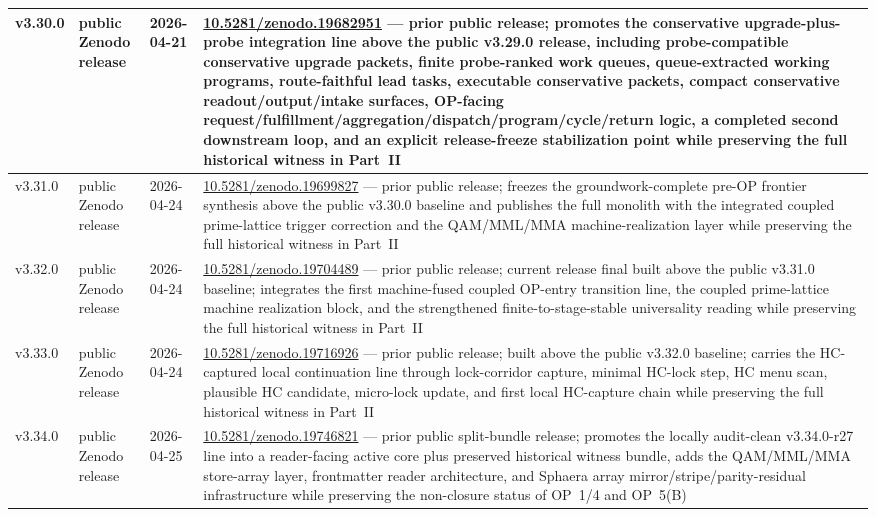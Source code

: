 {\begin{longtable}{|p{}|p{}|p{}|p{}|}
\hline
v3.30.0 & public Zenodo release & 2026-04-21 & \href{https://doi.org/10.5281/zenodo.19682951}{10.5281/zenodo.19682951} --- prior public release; promotes the conservative upgrade-plus-probe integration line above the public v3.29.0 release, including probe-compatible conservative upgrade packets, finite probe-ranked work queues, queue-extracted working programs, route-faithful lead tasks, executable conservative packets, compact conservative readout/output/intake surfaces, OP-facing request/fulfillment/aggregation/dispatch/program/cycle/return logic, a completed second downstream loop, and an explicit release-freeze stabilization point while preserving the full historical witness in Part~II \\
\hline
v3.31.0 & public Zenodo release & 2026-04-24 & \href{https://doi.org/10.5281/zenodo.19699827}{10.5281/zenodo.19699827} --- prior public release; freezes the groundwork-complete pre-OP frontier synthesis above the public v3.30.0 baseline and publishes the full monolith with the integrated coupled prime-lattice trigger correction and the QAM/MML/MMA machine-realization layer while preserving the full historical witness in Part~II \\
\hline
v3.32.0 & public Zenodo release & 2026-04-24 & \href{https://doi.org/10.5281/zenodo.19704489}{10.5281/zenodo.19704489} --- prior public release; current release final built above the public v3.31.0 baseline; integrates the first machine-fused coupled OP-entry transition line, the coupled prime-lattice machine realization block, and the strengthened finite-to-stage-stable universality reading while preserving the full historical witness in Part~II \\
v3.33.0 & public Zenodo release & 2026-04-24 & \href{https://doi.org/10.5281/zenodo.19716926}{10.5281/zenodo.19716926} --- prior public release; built above the public v3.32.0 baseline; carries the HC-captured local continuation line through lock-corridor capture, minimal HC-lock step, HC menu scan, plausible HC candidate, micro-lock update, and first local HC-capture chain while preserving the full historical witness in Part~II \\
\hline
v3.34.0 & public Zenodo release & 2026-04-25 & \href{https://doi.org/10.5281/zenodo.19746821}{10.5281/zenodo.19746821} --- prior public split-bundle release; promotes the locally audit-clean v3.34.0-r27 line into a reader-facing active core plus preserved historical witness bundle, adds the QAM/MML/MMA store-array layer, frontmatter reader architecture, and Sphaera array mirror/stripe/parity-residual infrastructure while preserving the non-closure status of OP~1/4 and OP~5(B) \\

\end{longtable}}
